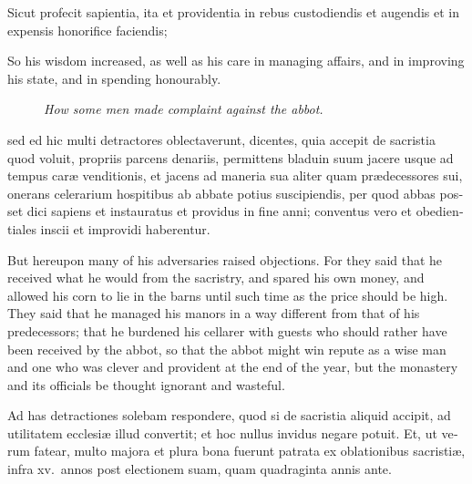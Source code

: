 \documentclass{book}
\newcommand{\blockhead}[4][]{
\begin{figure}
\centering
\vspace{#4}
\parbox{2.75cm}{\begin{center}\footnotesize \color{BrickRed} \emph{#2}\\ #1 \end{center}}
\end{figure}
}
\begin{document}
\begin{paracol}{2}
\switchcolumn*

\begin{otherlanguage}{latin}
Sicut profecit sapientia, ita et providentia in rebus custodiendis et augendis et in expensis honorifice faciendis;
\end{otherlanguage}

\switchcolumn

So his wisdom increased, as well as his care in managing affairs, and in improving his state, and in spending honourably.

\switchcolumn*

\begin{otherlanguage}{latin}
\blockhead{How some men made complaint against the abbot.}{4}{-0.45cm}
sed ed hic multi detractores oblectaverunt, dicentes, quia accepit de sacristia quod voluit, propriis parcens denariis, permittens bladuin suum jacere usque ad tempus car\ae{} venditionis, et jacens ad maneria sua aliter quam pr\ae{}decessores sui, onerans celerarium hospitibus ab abbate potius suscipiendis, per quod abbas posset dici sapiens et instauratus et providus in fine anni; conventus vero et obedientiales inscii et improvidi haberentur.

\end{otherlanguage}

\switchcolumn

But hereupon many of his adversaries raised objections. For they said that he received what he would from the sacristry, and spared his own money, and allowed his corn to lie in the barns until such time as the price should be high. They said that he managed his manors in a way different from that of his predecessors; that he burdened his cellarer with guests who should rather have been received by the abbot, so that the abbot might win repute as a wise man and one who was clever and provident at the end of the year, but the monastery and its officials be thought ignorant and wasteful.

\switchcolumn*

\begin{otherlanguage}{latin}
Ad has detractiones solebam respondere, quod si de sacristia aliquid accipit, ad utilitatem ecclesi\ae{} illud convertit; et hoc nullus invidus negare potuit. Et, ut verum fatear, multo majora et plura bona fuerunt patrata ex oblationibus sacristi\ae{}, infra xv.\ annos post electionem suam, quam quadraginta annis ante. 
\end{otherlanguage}

\switchcolumn


\end{paracol}
\end{document}
